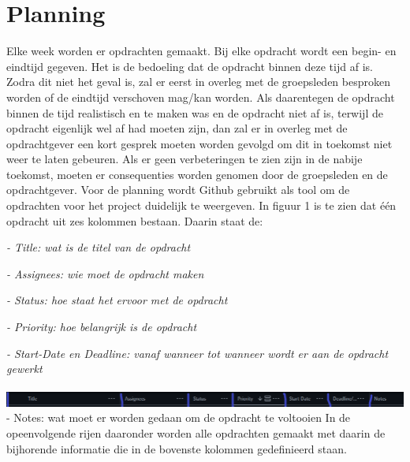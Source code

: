 \section{Planning}
Elke week worden er opdrachten gemaakt. Bij elke opdracht wordt een begin- en eindtijd gegeven. Het is de bedoeling dat de opdracht binnen deze tijd af is. Zodra dit niet het geval is, zal er eerst in overleg met de groepsleden besproken worden of de eindtijd verschoven mag/kan worden. Als daarentegen de opdracht binnen de tijd realistisch en te maken was en de opdracht niet af is, terwijl de opdracht eigenlijk wel af had moeten zijn, dan zal er in overleg met de opdrachtgever een kort gesprek moeten worden gevolgd om dit in toekomst niet weer te laten gebeuren. Als er geen verbeteringen te zien zijn in de nabije toekomst, moeten er consequenties worden genomen door de groepsleden en de opdrachtgever.
Voor de planning wordt Github gebruikt als tool om de opdrachten voor het project duidelijk te weergeven. In figuur 1 is te zien dat één opdracht uit zes kolommen bestaan. Daarin staat de:

\textit{- Title: wat is de titel van de opdracht}

\textit{- Assignees: wie moet de opdracht maken}

\textit{- Status: hoe staat het ervoor met de opdracht}

\textit{- Priority: hoe belangrijk is de opdracht}

\textit{- Start-Date en Deadline: vanaf wanneer tot wanneer wordt er aan de opdracht gewerkt}
\\\\
\includegraphics[width=6.7in]{IMG/08_planning_01.png} \\
- Notes: wat moet er worden gedaan om de opdracht te voltooien
In de opeenvolgende rijen daaronder worden alle opdrachten gemaakt met daarin de bijhorende informatie die in de bovenste kolommen gedefinieerd staan.
\\\\